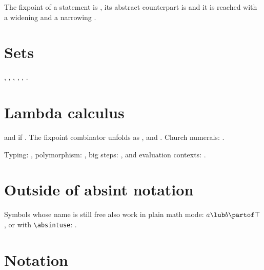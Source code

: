The fixpoint of a statement is ,
its abstract counterpart is  and it is reached
with a widening  and a narrowing .

\section{Sets}
, ,
, , ,
.

\section{Lambda calculus}
 and
 if .
The fixpoint combinator unfolds as ,
and \absexpr{\combS \app \combK \app \combK \betaeq \combI}.
Church numerals: .

Typing: ,
polymorphism: ,
big steps: , and evaluation contexts:
.

\section{Outside of absint notation}
Symbols whose name is still free also work in plain math mode:
\(a \lub b \partof \top\), or with \verb|\absintuse|: .

\section{Notation}
\absintlegend


